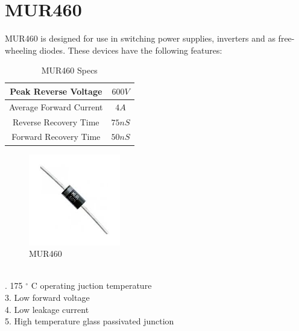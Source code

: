 \documentclass[12pt,a4paper]{report}
\begin{document}
	\section{MUR460}
		MUR460 is designed for use in switching power supplies, inverters and as free-wheeling diodes. These devices have the following features:\\
	\begin{minipage}{10cm}
		\begin{table}[H]
			\begin{center}
				\begin{tabular}{|c|c|} 
					\hline
					Peak Reverse Voltage & $600V$\\ 
					\hline
					Average Forward Current & $4A$\\ 
					\hline
					Reverse Recovery Time & $75nS$\\
					\hline
					Forward Recovery Time & $50nS$\\
					\hline
				\end{tabular}
			\end{center}
			\caption{MUR460 Specs}
		\end{table}
	\end{minipage}
	\begin{minipage}{5cm}
		\begin{figure}[H]
			\begin{center}
				\includegraphics[width=4cm,height=4cm]{figures/MUR460.jpg}
			\end{center}
			\caption{MUR460}	
		\end{figure}		
	\end{minipage}\\

. 175 $^{\circ}$ C operating juction temperature \\
	3. Low forward voltage \\
	4. Low leakage current\\
	5. High temperature glass passivated junction\\
	
\end{document}
